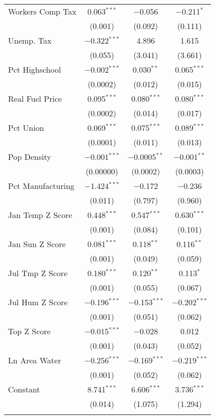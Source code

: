 \begin{table}[!htbp]
\begin{tabular}{@{\extracolsep{5pt}}lccc}
  Workers Comp Tax & 0.063$^{***}$ & $-$0.056 & $-$0.211$^{*}$ \\ 
  & (0.001) & (0.092) & (0.111) \\ 
  Unemp. Tax & $-$0.322$^{***}$ & 4.896 & 1.615 \\ 
  & (0.055) & (3.041) & (3.661) \\ 
  Pct Highschool & $-$0.002$^{***}$ & 0.030$^{**}$ & 0.065$^{***}$ \\ 
  & (0.0002) & (0.012) & (0.015) \\ 
  Real Fuel Price & 0.095$^{***}$ & 0.080$^{***}$ & 0.080$^{***}$ \\ 
  & (0.0002) & (0.014) & (0.017) \\ 
  Pct Union & 0.069$^{***}$ & 0.075$^{***}$ & 0.089$^{***}$ \\ 
  & (0.0001) & (0.011) & (0.013) \\ 
  Pop Density & $-$0.001$^{***}$ & $-$0.0005$^{**}$ & $-$0.001$^{**}$ \\ 
  & (0.00000) & (0.0002) & (0.0003) \\ 
  Pct Manufacturing & $-$1.424$^{***}$ & $-$0.172 & $-$0.236 \\ 
  & (0.011) & (0.797) & (0.960) \\ 
  Jan Temp Z Score & 0.448$^{***}$ & 0.547$^{***}$ & 0.630$^{***}$ \\ 
  & (0.001) & (0.084) & (0.101) \\ 
  Jan Sun Z Score & 0.081$^{***}$ & 0.118$^{**}$ & 0.116$^{**}$ \\ 
  & (0.001) & (0.049) & (0.059) \\ 
  Jul Tmp Z Score & 0.180$^{***}$ & 0.120$^{**}$ & 0.113$^{*}$ \\ 
  & (0.001) & (0.055) & (0.067) \\ 
  Jul Hum Z Score & $-$0.196$^{***}$ & $-$0.153$^{***}$ & $-$0.202$^{***}$ \\ 
  & (0.001) & (0.051) & (0.062) \\ 
  Top Z Score & $-$0.015$^{***}$ & $-$0.028 & 0.012 \\ 
  & (0.001) & (0.043) & (0.052) \\ 
  Ln Area Water & $-$0.256$^{***}$ & $-$0.169$^{***}$ & $-$0.219$^{***}$ \\ 
  & (0.001) & (0.052) & (0.062) \\ 
  Constant & 8.741$^{***}$ & 6.606$^{***}$ & 3.736$^{***}$ \\ 
  & (0.014) & (1.075) & (1.294) \\ 
 \hline \\[-1.8ex] 

\end{tabular}
\end{table}
